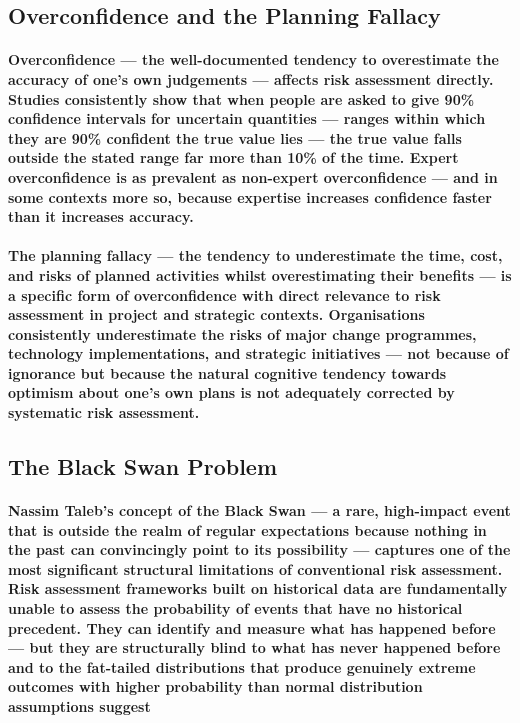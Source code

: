 \subsection{Overconfidence and the Planning Fallacy}
\paragraph{\textbf{Overconfidence} — the well-documented tendency to overestimate the accuracy of one's own judgements — affects risk assessment directly. Studies consistently show that when people are asked to give 90\% confidence intervals for uncertain quantities — ranges within which they are 90\% confident the true value lies — the true value falls outside the stated range far more than 10\% of the time. Expert overconfidence is as prevalent as non-expert overconfidence — and in some contexts more so, because expertise increases confidence faster than it increases accuracy.}
\paragraph{The \textbf{planning fallacy} — the tendency to underestimate the time, cost, and risks of planned activities whilst overestimating their benefits — is a specific form of overconfidence with direct relevance to risk assessment in project and strategic contexts. Organisations consistently underestimate the risks of major change programmes, technology implementations, and strategic initiatives — not because of ignorance but because the natural cognitive tendency towards optimism about one's own plans is not adequately corrected by systematic risk assessment.}

\subsection{The Black Swan Problem}
\paragraph{Nassim Taleb's concept of the \textbf{Black Swan} — a rare, high-impact event that is outside the realm of regular expectations because nothing in the past can convincingly point to its possibility — captures one of the most significant structural limitations of conventional risk assessment. Risk assessment frameworks built on historical data are fundamentally unable to assess the probability of events that have no historical precedent. They can identify and measure what has happened before — but they are structurally blind to what has never happened before and to the fat-tailed distributions that produce genuinely extreme outcomes with higher probability than normal distribution assumptions suggest}
